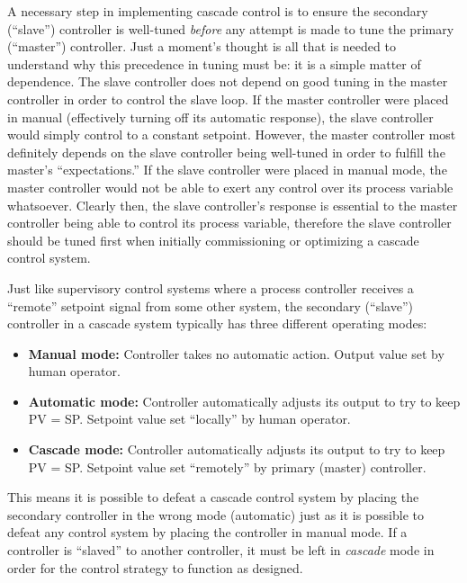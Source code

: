 \vskip 10pt

A necessary step in implementing cascade control is to ensure the secondary (``slave'') controller is well-tuned \textit{before} any attempt is made to tune the primary (``master'') controller.  Just a moment's thought is all that is needed to understand why this precedence in tuning must be: it is a simple matter of dependence.  The slave controller does not depend on good tuning in the master controller in order to control the slave loop.  If the master controller were placed in manual (effectively turning off its automatic response), the slave controller would simply control to a constant setpoint.  However, the master controller most definitely depends on the slave controller being well-tuned in order to fulfill the master's ``expectations.''  If the slave controller were placed in manual mode, the master controller would not be able to exert any control over its process variable whatsoever.  Clearly then, the slave controller's response is essential to the master controller being able to control its process variable, therefore the slave controller should be tuned first when initially commissioning or optimizing a cascade control system.

\vskip 10pt

Just like supervisory control systems where a process controller receives a ``remote'' setpoint signal from some other system, the secondary (``slave'') controller in a cascade system typically has three different operating modes:

\begin{itemize}
\item \textbf{Manual mode:} Controller takes no automatic action.  Output value set by human operator.
\item \textbf{Automatic mode:} Controller automatically adjusts its output to try to keep PV = SP.  Setpoint value set ``locally'' by human operator.
\item \textbf{Cascade mode:} Controller automatically adjusts its output to try to keep PV = SP.  Setpoint value set ``remotely'' by primary (master) controller.
\end{itemize}

This means it is possible to defeat a cascade control system by placing the secondary controller in the wrong mode (automatic) just as it is possible to defeat any control system by placing the controller in manual mode.  If a controller is ``slaved'' to another controller, it must be left in \textit{cascade} mode in order for the control strategy to function as designed.

